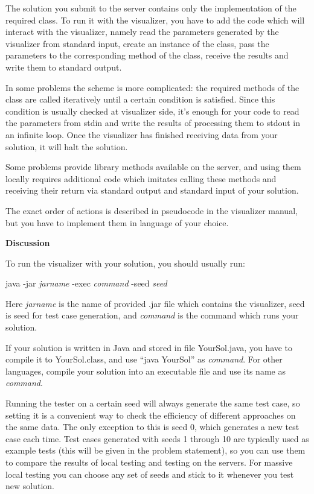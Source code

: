 \documentclass[]{article}
\begin{document}
The solution you submit to the server contains only the implementation
of the required class. To run it with the visualizer, you have to add
the code which will interact with the visualizer, namely read the
parameters generated by the visualizer from standard input, create an
instance of the class, pass the parameters to the corresponding method
of the class, receive the results and write them to standard output.

In some problems the scheme is more complicated: the required methods of
the class are called iteratively until a certain condition is satisfied.
Since this condition is usually checked at visualizer side, it's enough
for your code to read the parameters from stdin and write the results of
processing them to stdout in an infinite loop. Once the visualizer has
finished receiving data from your solution, it will halt the solution.

Some problems provide library methods available on the server, and using
them locally requires additional code which imitates calling these
methods and receiving their return via standard output and standard
input of your solution.

The exact order of actions is described in pseudocode in the visualizer
manual, but you have to implement them in language of your choice.

\textbf{Discussion}

To run the visualizer with your solution, you should usually run:

java -jar \emph{jarname} -exec \emph{command} -seed \emph{seed}

Here \emph{jarname} is the name of provided .jar file which contains the
visualizer, seed is seed for test case generation, and \emph{command} is
the command which runs your solution.

If your solution is written in Java and stored in file YourSol.java, you
have to compile it to YourSol.class, and use ``java YourSol'' as
\emph{command}. For other languages, compile your solution into an
executable file and use its name as \emph{command}.

Running the tester on a certain seed will always generate the same test
case, so setting it is a convenient way to check the efficiency of
different approaches on the same data. The only exception to this is
seed 0, which generates a new test case each time. Test cases generated
with seeds 1 through 10 are typically used as example tests (this will
be given in the problem statement), so you can use them to compare the
results of local testing and testing on the servers. For massive local
testing you can choose any set of seeds and stick to it whenever you
test new solution.
\end{document}
